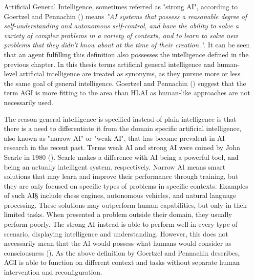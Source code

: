 

Artificial General Intelligence, sometimes referred as "strong AI", according to
Goertzel and Pennachin (\cite*{goertzel2007}) means \emph{"AI systems that
possess a reasonable degree of self-understanding and autonomous self-control,
and have the ability to solve a variety of complex problems in a variety of
contexts, and to learn to solve new problems that they didn't know about at the
time of their creation."}. It can be seen that an agent fulfilling this
definition also possesses the intelligence defined in the previous chapter. In
this thesis terms artificial general intelligence and human-level artificial
intelligence are treated as synonyms, as they pursue more or less the same goal
of general intelligence. Goertzel and Pennachin (\cite*{goertzel2007}) suggest
that the term AGI is more fitting to the area than HLAI as human-like approaches
are not necessarily used.

The reason general intelligence is specified instead of plain intelligence is
that there is a need to differentiate it from the domain specific artificial
intelligence, also known as "narrow AI" or "weak AI", that has become prevalent
in AI research in the recent past. Terms weak AI and strong AI were coined by
John Searle in 1980 (\cite{searle1980}). Searle makes a difference with AI being
a powerful tool, and being an actually intelligent system, respectively. Narrow
AI means smart solutions that may learn and improve their performance through
training, but they are only focused on specific types of problems in specific
contexts. Examples of such AI§ include chess engines, autonomous vehicles, and
natural language processing. These solutions may outperform human capabilities,
but only in their limited tasks. When presented a problem outside their domain,
they usually perform poorly. The strong AI instead is able to perform well in
every type of scenario, displaying intelligence and understanding. However, this
does not necessarily mean that the AI would possess what humans would consider
as consciousness (\cite{searle1980}). As the above definition by Goertzel and
Pennachin describes, AGI is able to function on different context and tasks
without separate human intervention and reconfiguration.


